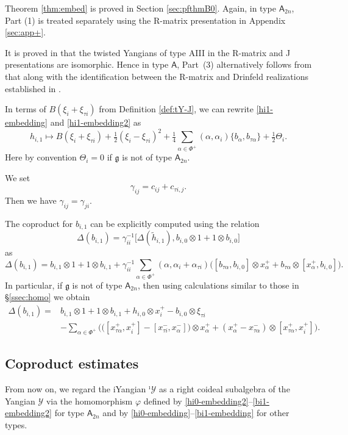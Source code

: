 \documentclass[11pt,reqno]{amsart}
\numberwithin{equation}{section}
\theoremstyle{definition}
\theoremstyle{remark}
\newcommand{\beq}{\begin{equation}}
\newcommand{\eeq}{\end{equation}}
\newcommand{\be}{\begin{equation*}}
\newcommand{\ee}{\end{equation*}}
\newcommand{\hf}{\tfrac12}
\newcommand{\g}{\mathfrak{g}}
\newcommand{\tl}{\tilde}
\newcommand{\Y}{{\mathscr{Y}}}
\newcommand{\Yi}{{^\imath\mathscr{Y}}}
\begin{document}
Theorem \ref{thm:embed} is proved in Section \ref{sec:pfthmB0}. Again, in type $\mathsf A_{2n}$, Part (1) is treated separately using the R-matrix presentation in Appendix \ref{sec:app+}.

It is proved in \cite{CGM14} that the twisted Yangians of type AIII in the R-matrix and J presentations are isomorphic. Hence in type \(\mathsf A\), Part~(3) alternatively follows from that along with the identification between the R-matrix and Drinfeld realizations
established in \cite{LZ24}.

In terms of $B(\xi_i+\xi_{\tau i})$ from Definition \ref{def:tY-J}, we can rewrite \eqref{hi1-embedding} and \eqref{hi1-embedding2} as
\be
h_{i,1}\mapsto B(\xi_i+\xi_{\tau i})+\hf(\xi_i-\xi_{\tau i})^2+\tfrac{1}4\sum_{\alpha\in\Phi^+}(\alpha,\alpha_i)\big\{b_{\alpha}, b_{\tau \alpha}\big\}+\hf\Theta_i.
\ee
Here by convention $\Theta_i=0$ if $\g$ is not of type $\mathsf A_{2n}$.

We set
\beq\label{eq:gamma-def}
\gamma_{ij}=c_{ij}+c_{\tau i,j}.
\eeq
Then we have $\gamma_{ij}=\gamma_{ji}$.

The coproduct for $b_{i,1}$ can be explicitly computed using the relation 
\[
\Delta(b_{i,1})=\gamma_{ii}^{-1}\big[\Delta(\tl h_{i,1}),b_{i,0}\otimes 1+1\otimes b_{i,0}\big]
\]
as
\begin{equation*}
\Delta(b_{i,1})
=
b_{i,1}\otimes 1+1\otimes b_{i,1}
+
\gamma_{ii}^{-1}
\sum_{\alpha\in\Phi^+}
(\alpha,\alpha_i+\alpha_{\tau i})
\Big(
[b_{\tau\alpha},b_{i,0}]\otimes x_\alpha^+
+
b_{\tau\alpha}\otimes[x_\alpha^+,b_{i,0}]
\Big).
\end{equation*}
In particular, if $\g$ is not of type $\mathsf A_{2n}$, then using calculations similar to those in \S\ref{ssec:homo} we obtain
\beq\label{helper98}
\begin{split}
\Delta(b_{i,1})={}&b_{i,1}\otimes 1+1\otimes b_{i,1}+h_{i,0}\otimes x_{i}^+-b_{i,0}\otimes \xi_{\tau i}\\&-\sum_{\alpha\in\Phi^+}\Big(\big([x_{\tau\alpha}^+,x_i^+]-[x_{\tau i}^-,x_{\alpha}^-]\big)\otimes x_\alpha^++(x_\alpha^+-x_{\tau\alpha}^-)\otimes [x_{\tau\alpha}^+,x_i^+]\Big).
\end{split}
\eeq

\subsection{Coproduct estimates}
From now on, we regard the iYangian $\Yi$ as a right coideal subalgebra of the Yangian $\Y$ via the homomorphism $\varphi$ defined by \eqref{hi0-embedding2}--\eqref{bi1-embedding2} for type $\mathsf A_{2n}$ and by \eqref{hi0-embedding}--\eqref{bi1-embedding} for other types. 
\end{document}
